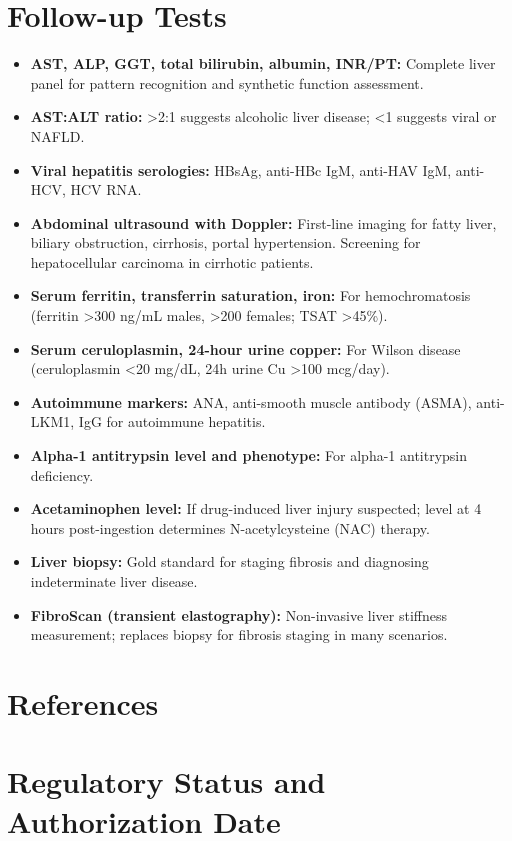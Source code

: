 \section*{Follow-up Tests}
\begin{itemize}
  \item \textbf{AST, ALP, GGT, total bilirubin, albumin, INR/PT:} Complete liver panel for pattern recognition and synthetic function assessment.
  \item \textbf{AST:ALT ratio:} >2:1 suggests alcoholic liver disease; <1 suggests viral or NAFLD.
  \item \textbf{Viral hepatitis serologies:} HBsAg, anti-HBc IgM, anti-HAV IgM, anti-HCV, HCV RNA.
  \item \textbf{Abdominal ultrasound with Doppler:} First-line imaging for fatty liver, biliary obstruction, cirrhosis, portal hypertension. Screening for hepatocellular carcinoma in cirrhotic patients.
  \item \textbf{Serum ferritin, transferrin saturation, iron:} For hemochromatosis (ferritin >300 ng/mL males, >200 females; TSAT >45\%).
  \item \textbf{Serum ceruloplasmin, 24-hour urine copper:} For Wilson disease (ceruloplasmin <20 mg/dL, 24h urine Cu >100 mcg/day).
  \item \textbf{Autoimmune markers:} ANA, anti-smooth muscle antibody (ASMA), anti-LKM1, IgG for autoimmune hepatitis.
  \item \textbf{Alpha-1 antitrypsin level and phenotype:} For alpha-1 antitrypsin deficiency.
  \item \textbf{Acetaminophen level:} If drug-induced liver injury suspected; level at 4 hours post-ingestion determines N-acetylcysteine (NAC) therapy.
  \item \textbf{Liver biopsy:} Gold standard for staging fibrosis and diagnosing indeterminate liver disease.
  \item \textbf{FibroScan (transient elastography):} Non-invasive liver stiffness measurement; replaces biopsy for fibrosis staging in many scenarios.
\end{itemize}

\section*{References}



\clearpage
\section*{Regulatory Status and Authorization Date}

\clearpage
